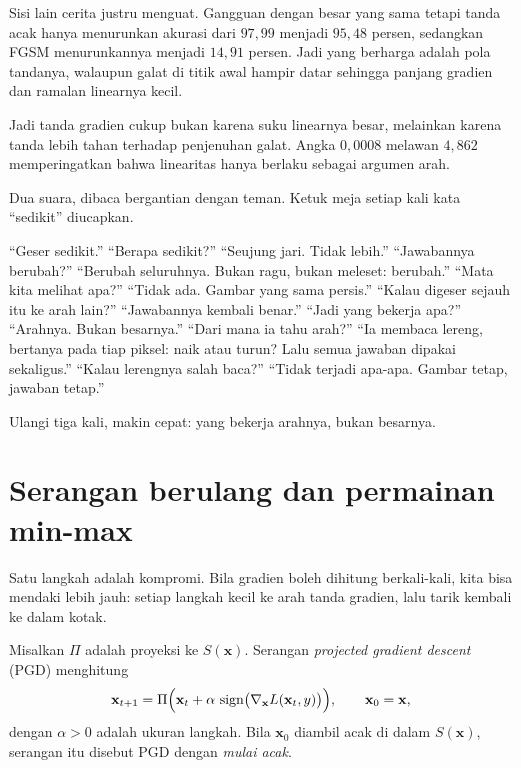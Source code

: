 Sisi lain cerita justru menguat. Gangguan dengan besar yang sama tetapi tanda acak
hanya menurunkan akurasi dari $97{,}99$ menjadi $95{,}48$ persen, sedangkan FGSM
menurunkannya menjadi $14{,}91$ persen. Jadi yang berharga adalah pola tandanya,
walaupun galat di titik awal hampir datar sehingga panjang gradien dan ramalan
linearnya kecil.

Jadi tanda gradien cukup bukan karena suku linearnya besar, melainkan karena tanda
lebih tahan terhadap penjenuhan galat. Angka $0{,}0008$ melawan $4{,}862$
memperingatkan bahwa linearitas hanya berlaku sebagai argumen arah.

\begin{bacakeras}
Dua suara, dibaca bergantian dengan teman. Ketuk meja setiap kali kata ``sedikit''
diucapkan.

``Geser sedikit.'' ``Berapa sedikit?'' ``Seujung jari. Tidak lebih.''
``Jawabannya berubah?'' ``Berubah seluruhnya. Bukan ragu, bukan meleset: berubah.''
``Mata kita melihat apa?'' ``Tidak ada. Gambar yang sama persis.''
``Kalau digeser sejauh itu ke arah lain?'' ``Jawabannya kembali benar.''
``Jadi yang bekerja apa?'' ``Arahnya. Bukan besarnya.''
``Dari mana ia tahu arah?'' ``Ia membaca lereng, bertanya pada tiap piksel: naik atau
turun? Lalu semua jawaban dipakai sekaligus.''
``Kalau lerengnya salah baca?'' ``Tidak terjadi apa-apa. Gambar tetap, jawaban tetap.''

Ulangi tiga kali, makin cepat: yang bekerja arahnya, bukan besarnya.
\end{bacakeras}

\section{Serangan berulang dan permainan min-max}

Satu langkah adalah kompromi. Bila gradien boleh dihitung berkali-kali, kita bisa
mendaki lebih jauh: setiap langkah kecil ke arah tanda gradien, lalu tarik kembali
ke dalam kotak.

\begin{definisi}
Misalkan $\Pi$ adalah proyeksi ke $S(\mathbf{x})$. Serangan \emph{projected gradient
descent} (PGD) menghitung
\[
  \mathbf{x}_{t+1}=\Pi\Bigl(\mathbf{x}_t+\alpha\,
  \operatorname{sign}\bigl(\nabla_{\mathbf{x}}L(\mathbf{x}_t,y)\bigr)\Bigr),
  \qquad \mathbf{x}_0=\mathbf{x},
\]
dengan $\alpha>0$ adalah ukuran langkah. Bila $\mathbf{x}_0$ diambil acak di dalam
$S(\mathbf{x})$, serangan itu disebut PGD dengan \emph{mulai acak}.
\end{definisi}

